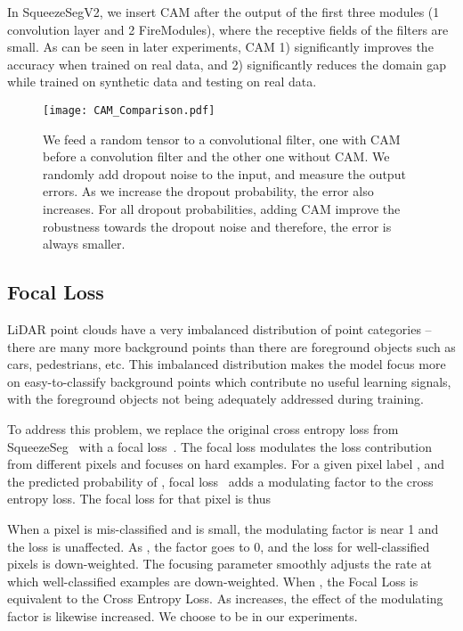 \documentclass[letterpaper, 10 pt, conference]{ieeeconf}
\begin{document}
In SqueezeSegV2, we insert CAM after the output of the first three modules (1 convolution layer and 2 FireModules), where the receptive fields of the filters are small. As can be seen in later experiments, CAM 1) significantly improves the accuracy when trained on real data, and 2) significantly reduces the domain gap while trained on synthetic data and testing on real data.

\begin{figure}[!t]
\begin{center}
\centering \texttt{[image: CAM\_Comparison.pdf]}
\caption{We feed a random tensor to a convolutional filter, one with CAM before a  convolution filter and the other one without CAM. We randomly add dropout noise to the input, and measure the output errors. As we increase the dropout probability, the error also increases. For all dropout probabilities, adding CAM improve the robustness towards the dropout noise and therefore, the error is always smaller.}
\vspace{-0.5cm}
\label{fig:CAM_Comparison}
\end{center}
\end{figure}
\subsection{Focal Loss}
\label{ssec:Focal} 
LiDAR point clouds have a very imbalanced distribution of point categories -- there are many more background points than there are foreground objects such as cars, pedestrians, etc. This imbalanced distribution makes the model focus more on easy-to-classify background points which contribute no useful learning signals, with the foreground objects not being adequately addressed during training.

To address this problem, we replace the original cross entropy loss from SqueezeSeg~\cite{wu2017squeezeseg} with a focal loss~\cite{lin2018focal}. The focal loss modulates the loss contribution from different pixels and focuses on hard examples. For a given pixel label , and the predicted probability of , focal loss~\cite{lin2018focal} adds a modulating factor  to the cross entropy loss. The focal loss for that pixel is thus

When a pixel is mis-classified and  is small, the
modulating factor is near 1 and the loss is unaffected. As
, the factor goes to 0, and the loss for well-classified
pixels is down-weighted. The focusing parameter  smoothly adjusts the rate at which well-classified examples are down-weighted.
When , the Focal Loss is equivalent to the Cross Entropy Loss. As  increases, the effect of the modulating factor is likewise increased. We choose  to be  in our experiments.
\end{document}

